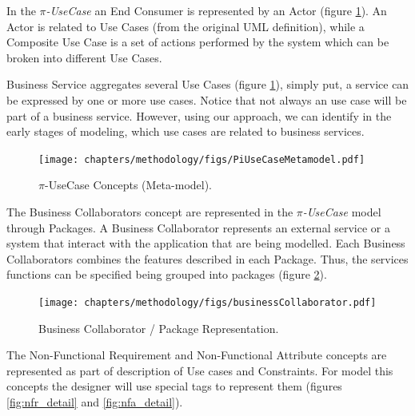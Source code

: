 In the \textit{$\pi$-UseCase} an {\sc End Consumer} is represented by an {\sc
Actor} (figure \ref{fig:usecasemodel}). An {\sc Actor} is related to {\sc Use Cases}
(from the original UML definition), while a {\sc Composite Use Case} is a set of
actions performed by the system which can be broken into different {\sc Use Cases}.


{\sc Business Service} aggregates several {\sc Use Cases} (figure
\ref{fig:usecasemodel}), simply put, a service can be expressed by one or more
use cases. Notice that not always an use case will be part of a business
service. However, using our approach, we can identify in the early stages of
modeling, which use cases are related to business services.


\begin{figure}[ht!]
\centering
\texttt{[image: chapters/methodology/figs/PiUseCaseMetamodel.pdf]}
\caption{$\pi$-UseCase Concepts (Meta-model).}
\label{fig:usecasemodel}
\end{figure}


The {\sc Business Collaborators} concept are represented in the
\textit{$\pi$-UseCase} model through {\sc Packages}. A {\sc Business
Collaborator} represents an external service or a system that interact
with the application that are being modelled. Each {\sc Business Collaborators}
combines the features described in each {\sc Package}. Thus, the
services functions can be specified being grouped into packages (figure
\ref{fig:businessCollaborator}).

\begin{figure}[ht!]
\centering
\texttt{[image: chapters/methodology/figs/businessCollaborator.pdf]}
\caption{Business Collaborator / Package Representation.}
\label{fig:businessCollaborator}
\end{figure}


The {\sc Non-Functional Requirement} and {\sc Non-Functional Attribute} concepts
are represented as part of description of {\sc Use cases} and {\sc Constraints}.
For model this concepts the designer will use special tags to represent them  (figures
\ref{fig:nfr_detail} and \ref{fig:nfa_detail}).


